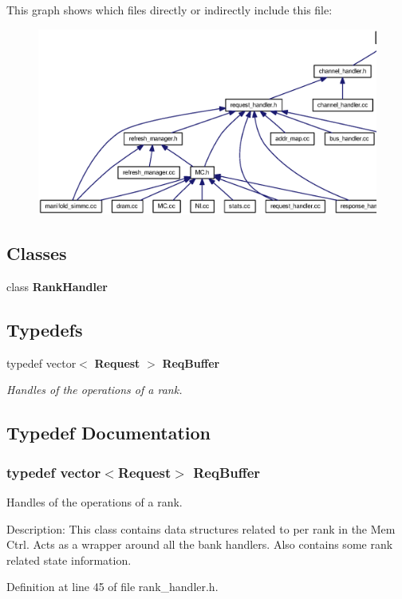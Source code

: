 This graph shows which files directly or indirectly include this file:\nopagebreak
\begin{figure}[H]
\begin{center}
\leavevmode
\includegraphics[width=374pt]{rank__handler_8h__dep__incl}
\end{center}
\end{figure}
\subsection*{Classes}
\begin{CompactItemize}
\item 
class {\bf RankHandler}
\end{CompactItemize}
\subsection*{Typedefs}
\begin{CompactItemize}
\item 
typedef vector$<$ {\bf Request} $>$ {\bf ReqBuffer}
\begin{CompactList}\small\item\em Handles of the operations of a rank. \item\end{CompactList}\end{CompactItemize}


\subsection{Typedef Documentation}
\subsubsection[{ReqBuffer}]{\setlength{\rightskip}{0pt plus 5cm}typedef vector$<${\bf Request}$>$ {\bf ReqBuffer}}\label{rank__handler_8h_4509a8b793d783dd97a7cbe45a22d138}


Handles of the operations of a rank. 

Description: This class contains data structures related to per rank in the Mem Ctrl. Acts as a wrapper around all the bank handlers. Also contains some rank related state information. 

Definition at line 45 of file rank\_\-handler.h.